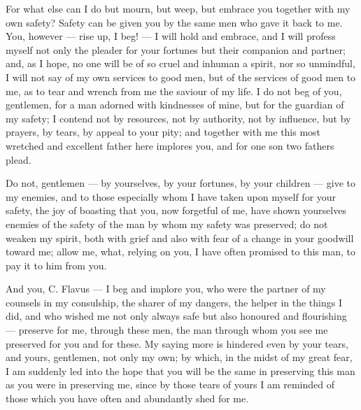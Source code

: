  For what else can I do but mourn, but weep, but embrace you together with my own safety? Safety can be given you by the same men who gave it back to me. You, however --- rise up, I beg! --- I will hold and embrace, and I will profess myself not only the pleader for your fortunes but their companion and partner; and, as I hope, no one will be of so cruel and inhuman a spirit, nor so unmindful, I will not say of my own services to good men, but of the services of good men to me, as to tear and wrench from me the saviour of my life. I do not beg of you, gentlemen, for a man adorned with kindnesses of mine, but for the guardian of my safety; I contend not by resources, not by authority, not by influence, but by prayers, by tears, by appeal to your pity; and together with me this most wretched and excellent father here implores you, and for one son two fathers plead.

 Do not, gentlemen --- by yourselves, by your fortunes, by your children --- give to my enemies, and to those especially whom I have taken upon myself for your safety, the joy of boasting that you, now forgetful of me, have shown yourselves enemies of the safety of the man by whom my safety was preserved; do not weaken my spirit, both with grief and also with fear of a change in your goodwill toward me; allow me, what, relying on you, I have often promised to this man, to pay it to him from you.

 And you, C. Flavus --- I beg and implore you, who were the partner of my counsels in my consulship, the sharer of my dangers, the helper in the things I did, and who wished me not only always safe but also honoured and flourishing --- preserve for me, through these men, the man through whom you see me preserved for you and for these. My saying more is hindered even by your tears, and yours, gentlemen, not only my own; by which, in the midst of my great fear, I am suddenly led into the hope that you will be the same in preserving this man as you were in preserving me, since by those tears of yours I am reminded of those which you have often and abundantly shed for me.
